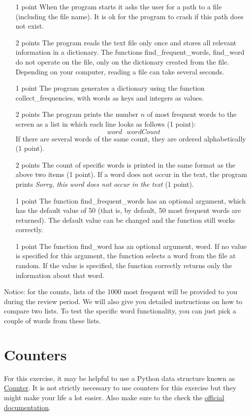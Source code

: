 \documentclass[11pt, a4paper]{article}
\begin{document}
\begin{itemize}
\item[1 point] When the program starts it asks the user for a path to a file (including the file name). It is ok for the program to crash if this path does not exist.
\item[2 points] The program reads the text file only once and stores all relevant information in a dictionary. The functions find\_frequent\_words, find\_word do not operate on the file, only on the dictionary created from the file. Depending on your computer, reading a file can take several seconds.
\item[1 point] The program generates a dictionary using the function collect\_frequencies, with words as keys and integers as values.
\item[2 points] The program prints the number $n$ of most frequent words to the screen as a list in which each line looks as follows (1 point):
$$ word~~~wordCount $$
If there are several words of the same count, they are ordered alphabetically (1 point).
\item[2 points] The count of specific words is printed in the same format as the above two items (1 point). If a word does not occur in the text, the program prints \textit{Sorry, this
word does not occur in the text} (1 point).
\item[1 point] The function find\_frequent\_words has an optional argument, which has the default value of 50 (that is, by default, 50 most frequent words are returned). The default value can be changed and the function still works correctly.
\item[1 point] The function find\_word has an optional argument, word. If no value is specified for this argument, the function selects a word from the file at random. If the value is specified, the function correctly returns only the information about that word.
\end{itemize}

Notice: for the counts, lists of the 1000 most frequent will be provided to you during the review period. We will also give
you detailed instructions on how to compare two lists. To test the specific word functionality, you can just pick a couple of words from these lists.

\enlargethispage{1cm}
\section{Counters}
For this exercise, it may be helpful to use a Python data structure known as 
\href{https://pymotw.com/3/collections/counter.html}{Counter}. It is not strictly necessary to use counters for this exercise but they might make your life a lot easier. Also make sure to the check the \href{https://docs.python.org/3/library/collections.html#collections.Counter}{official documentation}.
\end{document}
